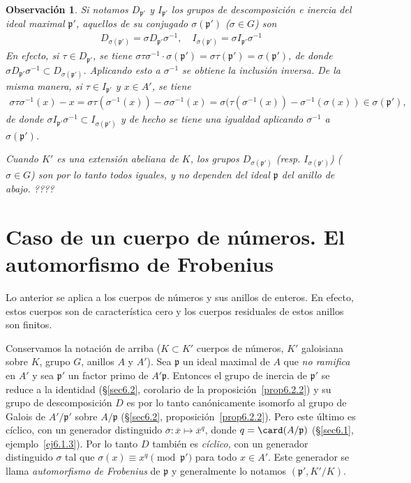 \documentclass[oneside,bibtotoc,leqno,spanish]{amsbook}
\newcommand{\idl}[1]{\mathfrak{#1}}
\newcommand{\oline}[1]{\overline{#1}}
\numberwithin{equation}{section}
\theoremstyle{defi}
\theoremstyle{note}
\theoremstyle{rem}
\newtheorem*{remark*}{Observaci\'on}
\numberwithin{theorem}{section}
\numberwithin{proposition}{section}
\numberwithin{definition}{section}
\numberwithin{lemma}{section}
\numberwithin{corollary}{section}
\numberwithin{example}{section}
\numberwithin{footnote}{section}%
\begin{document}
\begin{remark*}
Si notamos $D_{\idl{p}'}$ y $I_{\idl{p}'}$ los grupos de descomposici\'on e inercia del ideal maximal
$\idl{p}'$, aquellos de su {\em conjugado} $\sigma(\idl{p}')$ ($\sigma\in G$) son
\begin{gather}
D_{\sigma(\idl{p}')}=\sigma D_{\idl{p}'}\sigma^{-1},\quad I_{\sigma(\idl{p}')}=\sigma I_{\idl{p}'}\sigma^{-1}
\end{gather}
En efecto, si $\tau\in D_{\idl{p}'}$, se tiene $\sigma\tau\sigma^{-1}\cdot\sigma(\idl{p}')=\sigma\tau(\idl{p}')
=\sigma(\idl{p}')$, de donde $\sigma D_{\idl{p}'}\sigma^{-1}\subset D_{\sigma(\idl{p}')}$. Aplicando esto
a $\sigma^{-1}$ se obtiene la inclusi\'on inversa. De la misma manera, si $\tau\in I_{\idl{p}'}$ y $x\in A'$,
se tiene
\begin{gather*}
\sigma\tau\sigma^{-1}(x) - x = \sigma\tau(\sigma^{-1}(x))-\sigma\sigma^{-1}(x)=\sigma(\tau(\sigma^{-1}(x))
-\sigma^{-1}(\sigma(x))\in\sigma(\idl{p}'),
\end{gather*}
de donde $\sigma I_{\idl{p}'}\sigma^{-1}\subset I_{\sigma(\idl{p}')}$ y de hecho se tiene una igualdad
aplicando $\sigma^{-1}$ a $\sigma(\idl{p}')$.

Cuando $K'$ es una extensi\'on {\em abeliana} de $K$, los grupos $D_{\sigma(\idl{p}')}$ (resp.
$I_{\sigma(\idl{p}')}$) ($\sigma\in G$) son por lo tanto todos {\em iguales,} y no dependen del ideal
$\idl{p}$ del anillo de abajo. ????
\end{remark*}

\section{Caso de un cuerpo de n\'umeros. El automorfismo de Frobenius}\label{sec6.3}

Lo anterior se aplica a los cuerpos de n\'umeros y sus anillos de enteros. En efecto, estos cuerpos son de
caracter\'istica cero y los cuerpos residuales de estos anillos son finitos.

Conservamos la notaci\'on de arriba ($K\subset K'$ cuerpos de n\'umeros, $K'$ galoisiana sobre $K$, grupo $G$,
anillos $A$ y $A'$). Sea $\idl{p}$ un ideal maximal de $A$ que {\em no ramifica} en $A'$ y sea $\idl{p}'$ un
factor primo de $A'\idl{p}$. Entonces el grupo de inercia de $\idl{p}'$ se reduce a la identidad
(\S\ref{sec6.2}, corolario de la proposici\'on~\ref{prop6.2.2})
y su grupo de descomposici\'on $D$ es por lo tanto can\'onicamente isomorfo al
grupo de Galois de $A'/\idl{p}'$ sobre $A/\idl{p}$ (\S\ref{sec6.2}, proposici\'on~\ref{prop6.2.2}).
Pero este \'ultimo es c\'iclico, con un
generador distinguido $\oline\sigma:\oline x\mapsto\oline x^{q}$, donde $q = \card(A/\idl{p})$
(\S\ref{sec6.1}, ejemplo~\ref{ej6.1.3}). Por lo tanto $D$ tambi\'en es {\em c\'iclico,} con un generador distinguido $\sigma$ tal
que $\sigma(x) \equiv x^{q}\pmod{\idl{p}'}$ para todo $x\in A'$. Este generador se llama {\em automorfismo de
Frobenius} de $\idl{p}$ y generalmente lo notamos $(\idl{p}',K'/K)$.
\end{document}
